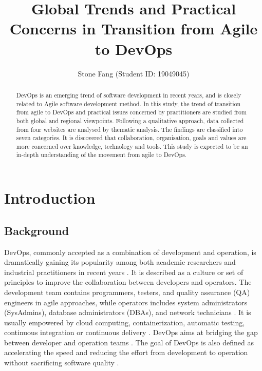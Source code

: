 \documentclass[
  12pt,
  a4paper,
]{article}
\title{Global Trends and Practical Concerns in Transition from Agile to DevOps}
\author{Stone Fang (Student ID: 19049045)}
\date{}
\begin{document}
\maketitle
\begin{abstract}
DevOps is an emerging trend of software development in recent years, and
is closely related to Agile software development method. In this study,
the trend of transition from agile to DevOps and practical issues
concerned by practitioners are studied from both global and regional
viewpoints. Following a qualitative approach, data collected from four
websites are analysed by thematic analysis. The findings are classified
into seven categories. It is discovered that collaboration,
organisation, goals and values are more concerned over knowledge,
technology and tools. This study is expected to be an in-depth
understanding of the movement from agile to DevOps.
\end{abstract}

\hypertarget{introduction}{%
\section{Introduction}\label{introduction}}

\hypertarget{background}{%
\subsection{Background}\label{background}}

DevOps, commonly accepted as a combination of development and operation,
is dramatically gaining its popularity among both academic researchers
and industrial practitioners in recent years
\citep{Jabbari:2016:what-is-devops} \citep{erich:2017:devops-practice}.
It is described as a culture or set of principles to improve the
collaboration between developers and operators. The development team
contains programmers, testers, and quality assurance (QA) engineers in
agile approaches, while operators includes system administrators
(SysAdmins), database administrators (DBAs), and network technicians
\citep{huttermann2012devops-Developers}. It is usually empowered by
cloud computing, containerization, automatic testing, continuous
integration or continuous delivery \citep{Jabbari:2016:what-is-devops}.
DevOps aims at bridging the gap between developer and operation teams
\citep{huttermann2012devops-Developers}. The goal of DevOps is also
defined as accelerating the speed and reducing the effort from
development to operation without sacrificing software quality
\citep{erich:2017:devops-practice}.
\end{document}
